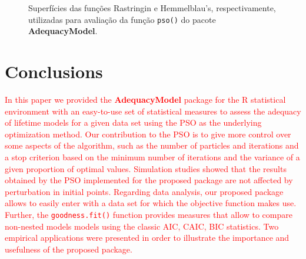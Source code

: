 \documentclass[10pt,letterpaper]{article}
\begin{document}
\begin{figure}[H]
	\centering

	\caption{Superfícies das funções Rastringin e Hemmelblau's, respectivamente, utilizadas para avaliação da função \texttt{pso()} do pacote \textbf{AdequacyModel}.}
\end{figure}





\section{Conclusions}

\textcolor{red}{In this paper we provided the \textbf{AdequacyModel} package for the \textsc{R} statistical environment with an easy-to-use set of statistical measures to assess the adequacy of lifetime models for a given data set using the PSO as the underlying optimization method. Our contribution to the PSO is to give more control over some aspects of the algorithm, such as the number of particles and iterations and a stop criterion based on the minimum number of iterations and the variance of a given proportion of optimal values. Simulation studies showed that the results obtained by the PSO implemented for the proposed package are not affected by perturbation in initial points. Regarding data analysis, our proposed package allows to easily enter with a data set for which the objective function makes use. Further, the \texttt{goodness.fit()} function provides measures that allow to compare non-nested models models using the classic AIC, CAIC, BIC statistics. Two empirical applications were presented in order to
illustrate the importance and usefulness of the proposed package.}
\end{document}
